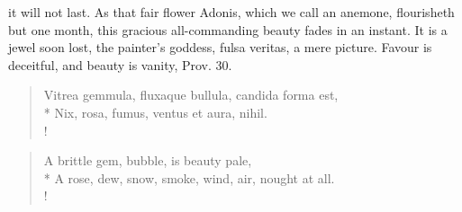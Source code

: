 it will not last. As that fair flower Adonis, which we call an
anemone, flourisheth but one month, this gracious all-commanding beauty
fades in an instant. It is a jewel soon lost, the painter's goddess,
fulsa veritas, a mere picture. Favour is deceitful, and beauty is
vanity, Prov.  30.
%
\begin{latin}
\begin{verse}%
Vitrea gemmula, fluxaque bullula, candida forma est,\\*
Nix, rosa, fumus, ventus et aura, nihil.\\!
\end{verse}%
\end{latin}
\translationrule%
\begin{verse}%
A brittle gem, bubble, is beauty pale,\\*
A rose, dew, snow, smoke, wind, air, nought at all.\\!
\end{verse}%
%

